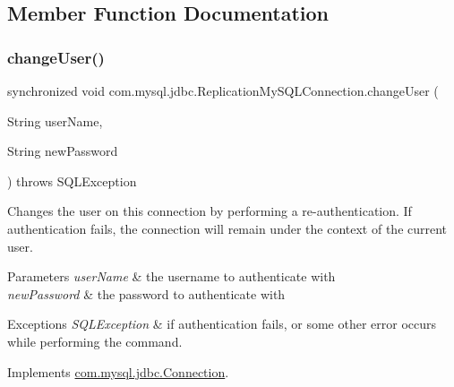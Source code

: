 \subsection{Member Function Documentation}
\mbox{\label{classcom_1_1mysql_1_1jdbc_1_1_replication_my_s_q_l_connection_adf68b57206ecf667f69b8d6243ac50d7}} 
\subsubsection{\texorpdfstring{change\+User()}{changeUser()}}
{\footnotesize\ttfamily synchronized void com.\+mysql.\+jdbc.\+Replication\+My\+S\+Q\+L\+Connection.\+change\+User (\begin{DoxyParamCaption}\item[{String}]{user\+Name,  }\item[{String}]{new\+Password }\end{DoxyParamCaption}) throws S\+Q\+L\+Exception}

Changes the user on this connection by performing a re-\/authentication. If authentication fails, the connection will remain under the context of the current user.


\begin{DoxyParams}{Parameters}
{\em user\+Name} & the username to authenticate with \\
\hline
{\em new\+Password} & the password to authenticate with \\
\hline
\end{DoxyParams}

\begin{DoxyExceptions}{Exceptions}
{\em S\+Q\+L\+Exception} & if authentication fails, or some other error occurs while performing the command. \\
\hline
\end{DoxyExceptions}


Implements \mbox{\hyperlink{interfacecom_1_1mysql_1_1jdbc_1_1_connection_a6a6160ecb2c19b5f246450ba9252907d}{com.\+mysql.\+jdbc.\+Connection}}.

